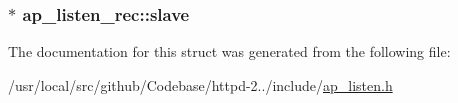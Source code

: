 \subsubsection[{\texorpdfstring{slave}{slave}}]{$\ast$ ap\+\_\+listen\+\_\+rec\+::slave}\hypertarget{structap__listen__rec_a77d60349cd91f583fae41ff136c9ca53}{}\label{structap__listen__rec_a77d60349cd91f583fae41ff136c9ca53}


The documentation for this struct was generated from the following file\+:\begin{DoxyCompactItemize}
\item 
/usr/local/src/github/\+Codebase/httpd-\/2../include/\hyperlink{ap__listen_8h}{ap\+\_\+listen.\+h}\end{DoxyCompactItemize}
